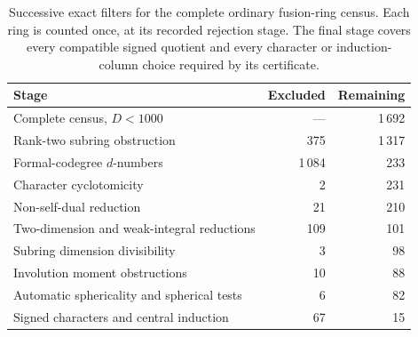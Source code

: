 \begin{table}[htbp]
\centering\small
\begin{tabular}{@{}lrr@{}}
\toprule
Stage & Excluded & Remaining \\
\midrule
Complete census, $D<1000$ & --- & 1\,692 \\
Rank-two subring obstruction & 375 & 1\,317 \\
Formal-codegree $d$-numbers & 1\,084 & 233 \\
Character cyclotomicity & 2 & 231 \\
Non-self-dual reduction & 21 & 210 \\
Two-dimension and weak-integral reductions & 109 & 101 \\
Subring dimension divisibility & 3 & 98 \\
Involution moment obstructions & 10 & 88 \\
Automatic sphericality and spherical tests & 6 & 82 \\
Signed characters and central induction & 67 & 15 \\
\bottomrule
\end{tabular}
\caption{Successive exact filters for the complete ordinary fusion-ring
census. Each ring is counted once, at its recorded rejection stage.
The final stage covers every compatible signed quotient and every
character or induction-column choice required by its certificate.}
\label{finite:tab:filters}
\end{table}
